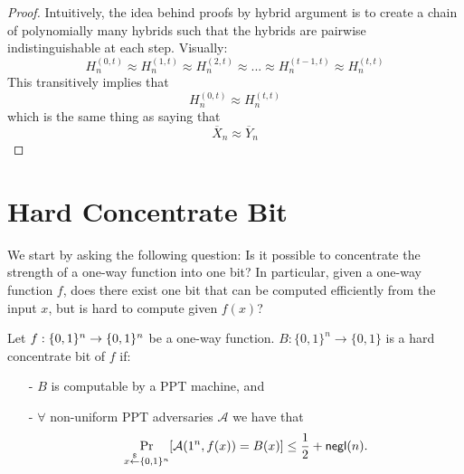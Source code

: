 \begin{proof}
Intuitively, the idea behind proofs by hybrid argument is to create a chain of polynomially many hybrids such that the hybrids are pairwise indistinguishable at each step.
Visually:
$$H^{(0,t)}_n \approx H^{(1,t)}_n \approx H^{(2,t)}_n \approx ... \approx H^{(t-1,t)}_n \approx H^{(t,t)}_n$$
This transitively implies that 
$$H^{(0,t)}_n \approx H^{(t,t)}_n$$
which is the same thing as saying that
$$\overline{X}_n \approx \overline{Y}_n$$


%
%
\end{proof}


\iffalse
\section{Hard Concentrate Bit}
We start by asking the following question: Is it possible to concentrate the strength of a one-way function into one bit? In particular, given a one-way function $f$, does there exist one bit that can be computed efficiently from the input $x$, but is hard to compute given $f(x)$?
\begin{definition}
Let $f:\{0,1\}^{n} \rightarrow \{0,1\}^{n}$ be a one-way function.
$B:\{0,1\}^n \rightarrow \{0,1\}$ is a hard concentrate bit of $f$ if:
\begin{itemize}
\item[-] $B$ is computable by a PPT machine, and
\item[-] $\forall$ non-uniform PPT adversaries $\mathcal{A}$ we have that
	$$\Pr_{x\stackrel{\$}{\leftarrow} \{0,1\}^{n}}[\mathcal{A}(1^n, f(x)) = B(x)] \leq \frac{1}{2} + \mathsf{negl}(n).$$
\end{itemize}
\end{definition}

